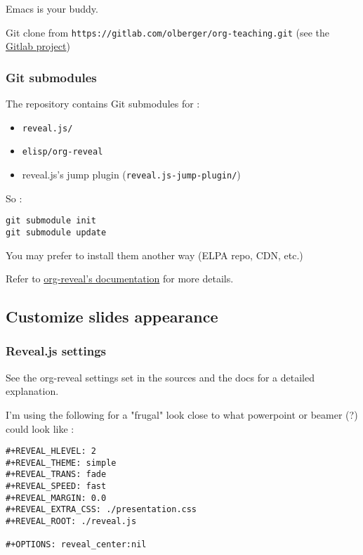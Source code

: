 \documentclass[a4paper]{article}
\begin{document}
Emacs is your buddy.

Git clone from \texttt{https://gitlab.com/olberger/org-teaching.git} (see the \href{https://gitlab.com/olberger/org-teaching}{Gitlab project})

\subsubsection{Git submodules}
\label{sec:orgc69aa1d}

The repository contains Git submodules for :
\begin{itemize}
\item \texttt{reveal.js/}
\item \texttt{elisp/org-reveal}
\item reveal.js's jump plugin (\texttt{reveal.js-jump-plugin/})
\end{itemize}

So :
\begin{verbatim}
git submodule init
git submodule update
\end{verbatim}
You may prefer to install them another way (ELPA repo, CDN, etc.)

\begin{NOTES}
Refer to \href{https://github.com/yjwen/org-reveal/\#requirements-and-installation}{org-reveal's documentation} for more details.
\end{NOTES}

\subsection{Customize slides appearance}
\label{sec:org7259649}

\subsubsection{Reveal.js settings}
\label{sec:org7fc9668}

See the org-reveal settings set in the sources and the docs for a detailed explanation.

I'm using the following for a "frugal" look close to what
powerpoint or beamer (?) could look like :

\begin{verbatim}
#+REVEAL_HLEVEL: 2
#+REVEAL_THEME: simple
#+REVEAL_TRANS: fade
#+REVEAL_SPEED: fast
#+REVEAL_MARGIN: 0.0
#+REVEAL_EXTRA_CSS: ./presentation.css
#+REVEAL_ROOT: ./reveal.js

#+OPTIONS: reveal_center:nil 
\end{verbatim}
\end{document}
